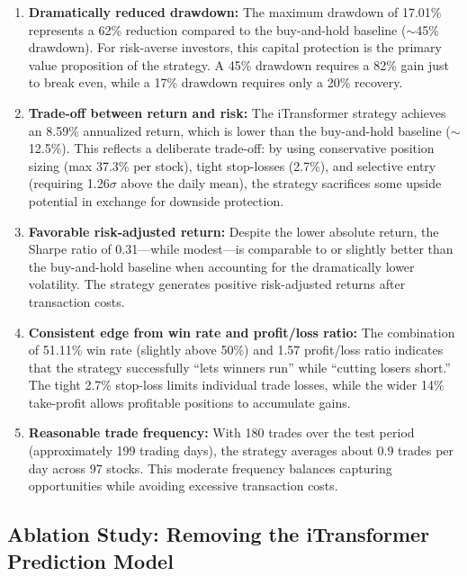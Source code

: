 \documentclass[12pt, a4paper]{article}
\begin{document}
\begin{enumerate}[leftmargin=2em]
    \item \textbf{Dramatically reduced drawdown:} The maximum drawdown of 17.01\% represents a 62\% reduction compared to the buy-and-hold baseline ($\sim$45\% drawdown). For risk-averse investors, this capital protection is the primary value proposition of the strategy. A 45\% drawdown requires a 82\% gain just to break even, while a 17\% drawdown requires only a 20\% recovery.

    \item \textbf{Trade-off between return and risk:} The iTransformer strategy achieves an 8.59\% annualized return, which is lower than the buy-and-hold baseline ($\sim$12.5\%). This reflects a deliberate trade-off: by using conservative position sizing (max 37.3\% per stock), tight stop-losses (2.7\%), and selective entry (requiring 1.26$\sigma$ above the daily mean), the strategy sacrifices some upside potential in exchange for downside protection.

    \item \textbf{Favorable risk-adjusted return:} Despite the lower absolute return, the Sharpe ratio of 0.31---while modest---is comparable to or slightly better than the buy-and-hold baseline when accounting for the dramatically lower volatility. The strategy generates positive risk-adjusted returns after transaction costs.

    \item \textbf{Consistent edge from win rate and profit/loss ratio:} The combination of 51.11\% win rate (slightly above 50\%) and 1.57 profit/loss ratio indicates that the strategy successfully ``lets winners run'' while ``cutting losers short.'' The tight 2.7\% stop-loss limits individual trade losses, while the wider 14\% take-profit allows profitable positions to accumulate gains.

    \item \textbf{Reasonable trade frequency:} With 180 trades over the test period (approximately 199 trading days), the strategy averages about 0.9 trades per day across 97 stocks. This moderate frequency balances capturing opportunities while avoiding excessive transaction costs.
\end{enumerate}

\subsection{Ablation Study: Removing the iTransformer Prediction Model}
\end{document}
